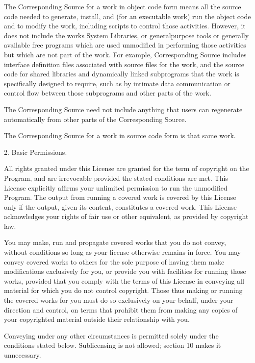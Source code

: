\documentclass[a4paper,10pt,english]{sphinxmanual}
\begin{document}
\begin{sphinxVerbatim}[commandchars=\\\{\}]
  The \PYGZdq{}Corresponding Source\PYGZdq{} for a work in object code form means all
the source code needed to generate, install, and (for an executable
work) run the object code and to modify the work, including scripts to
control those activities.  However, it does not include the work\PYGZsq{}s
System Libraries, or general\PYGZhy{}purpose tools or generally available free
programs which are used unmodified in performing those activities but
which are not part of the work.  For example, Corresponding Source
includes interface definition files associated with source files for
the work, and the source code for shared libraries and dynamically
linked subprograms that the work is specifically designed to require,
such as by intimate data communication or control flow between those
subprograms and other parts of the work.

  The Corresponding Source need not include anything that users
can regenerate automatically from other parts of the Corresponding
Source.

  The Corresponding Source for a work in source code form is that
same work.

  2. Basic Permissions.

  All rights granted under this License are granted for the term of
copyright on the Program, and are irrevocable provided the stated
conditions are met.  This License explicitly affirms your unlimited
permission to run the unmodified Program.  The output from running a
covered work is covered by this License only if the output, given its
content, constitutes a covered work.  This License acknowledges your
rights of fair use or other equivalent, as provided by copyright law.

  You may make, run and propagate covered works that you do not
convey, without conditions so long as your license otherwise remains
in force.  You may convey covered works to others for the sole purpose
of having them make modifications exclusively for you, or provide you
with facilities for running those works, provided that you comply with
the terms of this License in conveying all material for which you do
not control copyright.  Those thus making or running the covered works
for you must do so exclusively on your behalf, under your direction
and control, on terms that prohibit them from making any copies of
your copyrighted material outside their relationship with you.

  Conveying under any other circumstances is permitted solely under
the conditions stated below.  Sublicensing is not allowed; section 10
makes it unnecessary.


\end{sphinxVerbatim}
\end{document}
